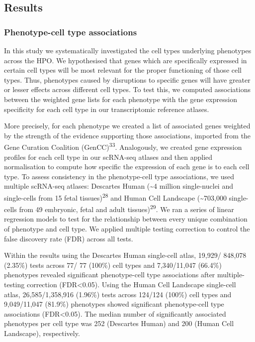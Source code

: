 \documentclass[
]{article}
\begin{document}
\subsection{Results}\label{sec-results}

\subsubsection{Phenotype-cell type
associations}\label{phenotype-cell-type-associations}

In this study we systematically investigated the cell types underlying
phenotypes across the HPO. We hypothesised that genes which are
specifically expressed in certain cell types will be most relevant for
the proper functioning of those cell types. Thus, phenotypes caused by
disruptions to specific genes will have greater or lesser effects across
different cell types. To test this, we computed associations between the
weighted gene lists for each phenotype with the gene expression
specificity for each cell type in our transcriptomic reference atlases.

More precisely, for each phenotype we created a list of associated genes
weighted by the strength of the evidence supporting those associations,
imported from the Gene Curation Coalition (GenCC)\textsuperscript{33}.
Analogously, we created gene expression profiles for each cell type in
our scRNA-seq atlases and then applied normalisation to compute how
specific the expression of each gene is to each cell type. To assess
consistency in the phenotype-cell type associations, we used multiple
scRNA-seq atlases: Descartes Human (\textasciitilde4 million
single-nuclei and single-cells from 15 fetal
tissues)\textsuperscript{28} and Human Cell Landscape
(\textasciitilde703,000 single-cells from 49 embryonic, fetal and adult
tissues)\textsuperscript{29}. We ran a series of linear regression
models to test for the relationship between every unique combination of
phenotype and cell type. We applied multiple testing correction to
control the false discovery rate (FDR) across all tests.

Within the results using the Descartes Human single-cell atlas, 19,929/
848,078 (2.35\%) tests across 77/ 77 (100\%) cell types and 7,340/11,047
(66.4\%) phenotypes revealed significant phenotype-cell type
associations after multiple-testing correction (FDR\textless0.05). Using
the Human Cell Landscape single-cell atlas, 26,585/1,358,916 (1.96\%)
tests across 124/124 (100\%) cell types and 9,049/11,047 (81.9\%)
phenotypes showed significant phenotype-cell type associations
(FDR\textless0.05). The median number of significantly associated
phenotypes per cell type was 252 (Descartes Human) and 200 (Human Cell
Landscape), respectively.
\end{document}
